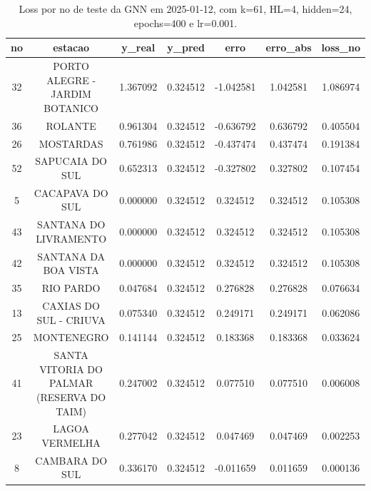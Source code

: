 \begin{table}[h]
\centering
\caption{Loss por no de teste da GNN em 2025-01-12, com k=61, HL=4, hidden=24, epochs=400 e lr=0.001.}
\label{tab:gnn_loss_k61_hl4_h24_e400_d20250112}
\begin{tabular}{ccccccc}
\toprule
no & estacao & y\_real & y\_pred & erro & erro\_abs & loss\_no \\
\midrule
32 & PORTO ALEGRE - JARDIM BOTANICO & 1.367092 & 0.324512 & -1.042581 & 1.042581 & 1.086974 \\
36 & ROLANTE & 0.961304 & 0.324512 & -0.636792 & 0.636792 & 0.405504 \\
26 & MOSTARDAS & 0.761986 & 0.324512 & -0.437474 & 0.437474 & 0.191384 \\
52 & SAPUCAIA DO SUL & 0.652313 & 0.324512 & -0.327802 & 0.327802 & 0.107454 \\
5 & CACAPAVA DO SUL & 0.000000 & 0.324512 & 0.324512 & 0.324512 & 0.105308 \\
43 & SANTANA DO LIVRAMENTO & 0.000000 & 0.324512 & 0.324512 & 0.324512 & 0.105308 \\
42 & SANTANA DA BOA VISTA & 0.000000 & 0.324512 & 0.324512 & 0.324512 & 0.105308 \\
35 & RIO PARDO & 0.047684 & 0.324512 & 0.276828 & 0.276828 & 0.076634 \\
13 & CAXIAS DO SUL - CRIUVA & 0.075340 & 0.324512 & 0.249171 & 0.249171 & 0.062086 \\
25 & MONTENEGRO & 0.141144 & 0.324512 & 0.183368 & 0.183368 & 0.033624 \\
41 & SANTA VITORIA DO PALMAR (RESERVA DO TAIM) & 0.247002 & 0.324512 & 0.077510 & 0.077510 & 0.006008 \\
23 & LAGOA VERMELHA & 0.277042 & 0.324512 & 0.047469 & 0.047469 & 0.002253 \\
8 & CAMBARA DO SUL & 0.336170 & 0.324512 & -0.011659 & 0.011659 & 0.000136 \\
\bottomrule
\end{tabular}
\end{table}
